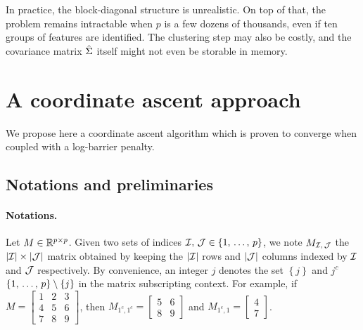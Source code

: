 \bigbreak
In practice, the block-diagonal structure is unrealistic.
On top of that, the problem remains intractable when $p$ is a few dozens of thousands,
even if ten groups of features are identified.
The clustering step may also be costly,
and the covariance matrix $\hat{\Sigma}$ itself might not even be storable in memory.

\section{A coordinate ascent approach}\label{sec:coordinate_ascent}

We propose here a coordinate ascent algorithm which is proven to converge when coupled with a log-barrier penalty.

\subsection{Notations and preliminaries}\label{subsec:notations_preliminaries}

\paragraph{Notations.}
Let $M \in \mathbb{R}^{p \times p}$.
Given two sets of indices $\mathcal{I},\,\mathcal{J} \in \left\{ 1,\, \dots,\, p \right\}$,
we note $M_{\mathcal{I},\,\mathcal{J}}$ the $\left\lvert\mathcal{I}\right\rvert \times \left\lvert\mathcal{J}\right\rvert$ matrix obtained by keeping
the $\left\lvert\mathcal{I}\right\rvert$ rows and $\left\lvert\mathcal{J}\right\rvert$ columns indexed by $\mathcal{I}$ and $\mathcal{J}$ respectively.
By convenience, an integer $j$ denotes the set $\left\{ j \right\}$ and $j^c$ $\left\{ 1,\, \dots,\, p \right\} \setminus \left\{ j \right\}$
in the matrix subscripting context.
For example, if $M = \begin{bmatrix}
    1 & 2 & 3\\
    4 & 5 & 6\\
    7 & 8 & 9
\end{bmatrix}$,
then $M_{1^c, 1^c} = \begin{bmatrix}
    5 & 6\\
    8 & 9
\end{bmatrix}$
and $M_{1^c, 1} = \begin{bmatrix}
    4\\
    7
\end{bmatrix}$.

